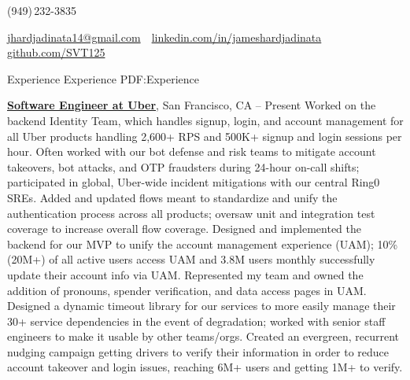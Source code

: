\documentclass[letterpaper,MMMyyyy,nonstopmode]{simpleresumecv}
\makeatletter
\newcommand{\ResumeAuthor}{James Hardjadinata}
\newcommand{\ResumeWebsite}{github.com/SVT125}
\newcommand{\ResumeLinkedin}{linkedin.com/in/jameshardjadinata}
\newcommand{\ResumeEmail}{jhardjadinata14@gmail.com}
\makeatother
\begin{document}

\Title{\ResumeAuthor}
\begin{SubTitle}
(949)\,232-3835
\par
\href{mailto:\ResumeEmail}
{\ResumeEmail}
\,\textbullet\,
\href{\ResumeLinkedin}
{\url{\ResumeLinkedin}}\,
\,\textbullet\,
\href{\ResumeWebsite}
{\url{\ResumeWebsite}}
\end{SubTitle}

\begin{Body}


\Section
{Experience}
{Experience}
{PDF:Experience}

\Entry
\href{https://www.uber.com/}
{\textbf{Software Engineer at Uber}},
San Francisco, CA
\hfill
{} --
Present
\Gap
\BulletItem Worked on the backend Identity Team, which handles signup, login, and account management for all Uber products handling 2,600+ RPS and 500K+ signup and login sessions per hour.
\BulletItem Often worked with our bot defense and risk teams to mitigate account takeovers, bot attacks, and OTP fraudsters during 24-hour on-call shifts; participated in global, Uber-wide incident mitigations with our central Ring0 SREs.
\BulletItem Added and updated flows meant to standardize and unify the authentication process across all products; oversaw unit and integration test coverage to increase overall flow coverage.
\BulletItem Designed and implemented the backend for our MVP to unify the account management experience (UAM); 10\% (20M+) of all active users access UAM and 3.8M users monthly successfully update their account info via UAM.
\BulletItem Represented my team and owned the addition of pronouns, spender verification, and data access pages in UAM.
\BulletItem Designed a dynamic timeout library for our services to more easily manage their 30+ service dependencies in the event of degradation; worked with senior staff engineers to make it usable by other teams/orgs.
\BulletItem Created an evergreen, recurrent nudging campaign getting drivers to verify their information in order to reduce account takeover and login issues, reaching 6M+ users and getting 1M+ to verify.
\newline


\end{Body}
\end{document}
